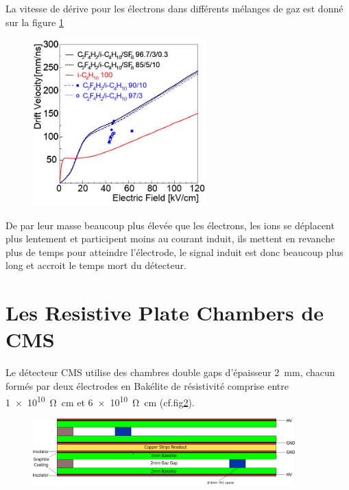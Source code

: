La vitesse de dérive pour les électrons dans différents mélanges de gaz est donné sur la figure \ref{drift} \cite{Riegler:570462}

\begin{figure}[ht!]
	\centering
	\includegraphics[width=0.60\textwidth]{RPC/drift.png}
	\label{drift}
\end{figure}

De par leur masse beaucoup plus élevée que les électrons, les ions se déplacent plus lentement et participent moins au courant induit, ils mettent en revanche plus de temps pour atteindre l'électrode, le signal induit est donc beaucoup plus long et accroit le temps mort du détecteur.

\section{Les Resistive Plate Chambers de CMS}

Le détecteur CMS utilise des chambres double gaps d'épaisseur \SI{2}{\milli\meter}, chacun formés par deux électrodes en Bakélite de résistivité comprise entre \SI{1e10}{\ohm\centi\meter} et \SI{6e10}{\ohm\centi\meter} (cf.fig\ref{cmsrpc}). 

\begin{figure}[ht!]
	\centering
	\includegraphics[width=0.90\textwidth]{RPC/CMSRPC.png}
	\label{cmsrpc}
\end{figure}

